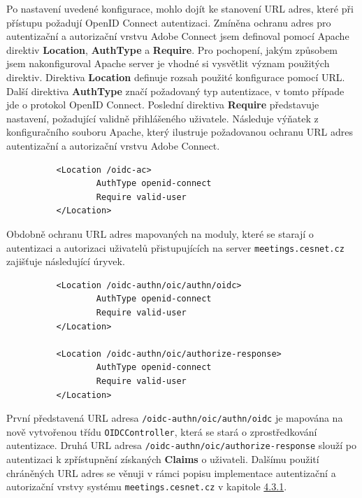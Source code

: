 \documentclass[
  printed, %
  twoside, %
  table,   %
  nolof,     %
  nolot,     %
]{fithesis3}
\begin{document}
Po nastavení uvedené konfigurace, mohlo dojít ke stanovení URL adres, které při přístupu požadují OpenID Connect autentizaci. Zmíněna ochranu adres pro autentizační a autorizační vrstvu Adobe Connect jsem definoval pomocí Apache direktiv \textbf{Location}, \textbf{AuthType} a \textbf{Require}. Pro pochopení, jakým způsobem jsem nakonfiguroval Apache server je vhodné si vysvětlit význam použitých direktiv. Direktiva \textbf{Location} definuje rozsah použité konfigurace pomocí URL. Další direktiva \textbf{AuthType} značí požadovaný typ autentizace, v tomto případe jde o protokol OpenID Connect. Poslední direktiva \textbf{Require} představuje nastavení, požadující validně přihlášeného uživatele. Následuje výňatek z konfiguračního souboru Apache, který ilustruje požadovanou ochranu URL adres autentizační a autorizační vrstvu Adobe Connect.
\begin{lstlisting}
          <Location /oidc-ac>
                  AuthType openid-connect
                  Require valid-user
          </Location>
\end{lstlisting}
\label{ac-location}

Obdobně ochranu URL adres mapovaných na moduly, které se starají o autentizaci a autorizaci uživatelů přistupujících na server \texttt{meetings.cesnet.cz} zajišťuje následující úryvek. 

\begin{lstlisting}
          <Location /oidc-authn/oic/authn/oidc>
                  AuthType openid-connect
                  Require valid-user
          </Location>
          
          <Location /oidc-authn/oic/authorize-response>
                  AuthType openid-connect
                  Require valid-user
          </Location>
\end{lstlisting}
První představená URL adresa \texttt{/oidc-authn/oic/authn/oidc} je mapována na nově vytvořenou třídu \texttt{OIDCController}, která se stará o zprostředkování autentizace. Druhá URL adresa \texttt{/oidc-authn/oic/authorize-response} slouží po autentizaci k zpřístupnění získaných \textbf{Claims} o uživateli. Dalšímu použití  chráněných URL adres se věnuji v rámci popisu implementace autentizační a autorizační vrstvy systému \texttt{meetings.cesnet.cz} v kapitole \hyperref[ShongoImpl-authn]{4.3.1}.

\label{shongo-location}
\end{document}
